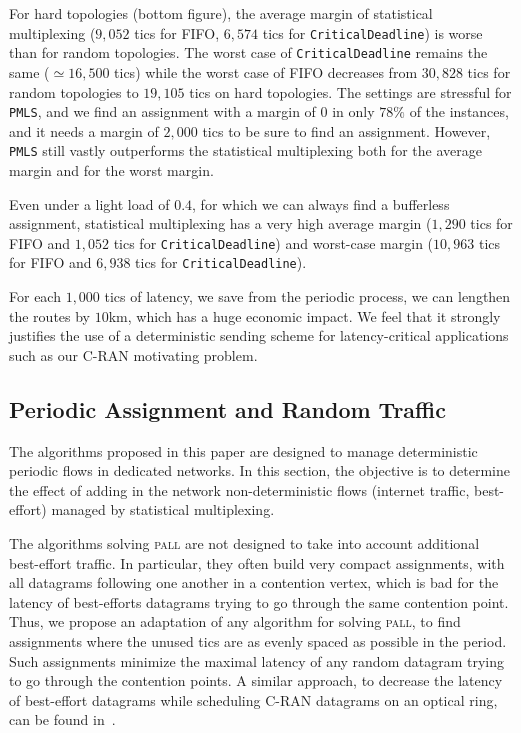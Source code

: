 \documentclass[a4paper,10pt]{journal}
\newcommand\PMLS{\texttt{PMLS}\xspace}
\newcommand\critdead{\texttt{CriticalDeadline}\xspace}
\newcommand\pall{\textsc{pall}\xspace}
\begin{document}
    For hard topologies (bottom figure), the average margin of statistical multiplexing ($9,052$ tics for FIFO, $6,574$ tics for \critdead) is worse than for random topologies. The worst case of \critdead  remains the same ($\simeq 16,500$ tics) while the worst case of FIFO decreases from $30,828$ tics for random topologies to $19,105$ tics on hard topologies. The settings are stressful for \PMLS, and we find an assignment with a margin of $0$ in only $78\%$ of the instances, and it needs a margin of $2,000$ tics to be sure to find an assignment. However, \PMLS still vastly outperforms the statistical multiplexing both for the average margin and for the worst margin. 
    
    Even under a light load of $0.4$, for which we can always find a bufferless assignment, statistical multiplexing has a very high average margin ($1,290$ tics for FIFO and $1,052$ tics for \critdead) and worst-case margin ($10,963$ tics for FIFO and $6,938$ tics for \critdead).

    For each $1,000$ tics of latency, we save from the periodic process, we can lengthen the routes by $10$km, which has a huge economic impact. We feel that it strongly justifies the use of a deterministic sending scheme for latency-critical applications such as our C-RAN motivating problem.    
     
    \subsection{Periodic Assignment and Random Traffic}
    
    The algorithms proposed in this paper are designed to manage deterministic periodic flows in dedicated networks. In this section, the objective is to determine the effect of adding in the network non-deterministic flows (internet traffic, best-effort) managed by statistical multiplexing.

    The algorithms solving \pall are not designed to take into account additional best-effort traffic. In particular, they often build very compact assignments, with all datagrams following one another in a contention vertex, which is bad for the latency of best-efforts datagrams trying to go through the same contention point. Thus, we propose an adaptation of any algorithm for solving \pall, to find assignments where the unused tics are as evenly spaced as possible in the period. Such assignments minimize the maximal latency of any random datagram trying to go through the contention points. A similar approach, to decrease the latency of best-effort datagrams while scheduling C-RAN datagrams on an optical ring, can be found in~\cite{DBLP:conf/ondm/BarthGS19}.
    
\end{document}
